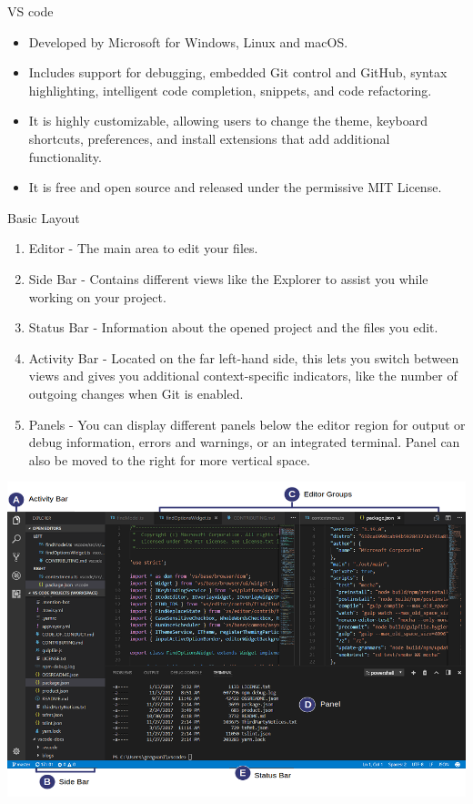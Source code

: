 \documentclass[xcolor=x11names,compress]{beamer}
\renewcommand{\(}{\begin{columns}}
\renewcommand{\)}{\end{columns}}
\newcommand{\<}[1]{\begin{column}{#1}}
\renewcommand{\>}{\end{column}}
\begin{document}
\begin{frame}{VS code}
	\begin{itemize}
	\item Developed by Microsoft for Windows, Linux and macOS.
	\item Includes support for debugging, embedded Git control and GitHub, syntax highlighting, intelligent code completion, snippets, and code refactoring.
	\item It is highly customizable, allowing users to change the theme, keyboard shortcuts, preferences, and install extensions that add additional functionality. \item It is free and open source and released under the permissive MIT License.
	\end{itemize}
	\end{frame}
	
\begin{frame}{Basic Layout}
	\begin{enumerate}
		\item Editor - The main area to edit your files. 
		\item Side Bar - Contains different views like the Explorer to assist you while working on your project.
		\item Status Bar - Information about the opened project and the files you edit.
\item Activity Bar - Located on the far left-hand side, this lets you switch between views and gives you additional context-specific indicators, like the number of outgoing changes when Git is enabled.
	\item Panels - You can display different panels below the editor region for output or debug information, errors and warnings, or an integrated terminal. Panel can also be moved to the right for more vertical space.
\end{enumerate}
\end{frame}
\begin{frame}
	\includegraphics[width = \textwidth, height = \textheight]{s1.png}
\end{frame}
\end{document}
